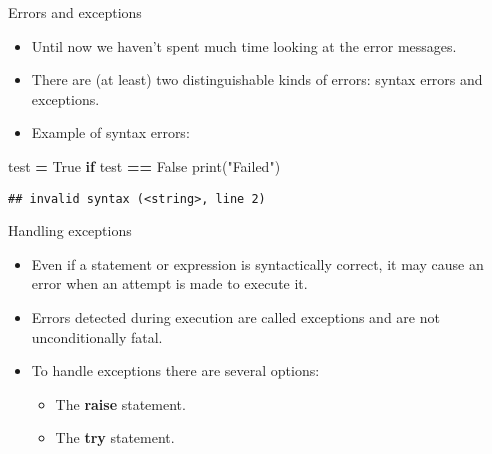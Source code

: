 \documentclass[
  8pt,
  ignorenonframetext,
]{beamer}
\newenvironment{Shaded}{\begin{snugshade}}{\end{snugshade}}
\newcommand{\BuiltInTok}[1]{#1}
\newcommand{\ControlFlowTok}[1]{\textcolor[rgb]{0.13,0.29,0.53}{\textbf{#1}}}
\newcommand{\NormalTok}[1]{#1}
\newcommand{\OperatorTok}[1]{\textcolor[rgb]{0.81,0.36,0.00}{\textbf{#1}}}
\newcommand{\StringTok}[1]{\textcolor[rgb]{0.31,0.60,0.02}{#1}}
\newcommand{\VariableTok}[1]{\textcolor[rgb]{0.00,0.00,0.00}{#1}}
\providecommand{\tightlist}{%
  \setlength{\itemsep}{0pt}\setlength{\parskip}{0pt}}
\begin{document}
\begin{frame}[fragile]{Errors and exceptions}
\protect\hypertarget{errors-and-exceptions}{}
\begin{itemize}
\item
  Until now we haven't spent much time looking at the error messages.
\item
  There are (at least) two distinguishable kinds of errors: syntax
  errors and exceptions.
\item
  Example of syntax errors:
\end{itemize}

\begin{Shaded}
\begin{Highlighting}[]
\NormalTok{test }\OperatorTok{=} \VariableTok{True}
\ControlFlowTok{if}\NormalTok{ test }\OperatorTok{==} \VariableTok{False}
  \BuiltInTok{print}\NormalTok{(}\StringTok{"Failed"}\NormalTok{)}
\end{Highlighting}
\end{Shaded}

\begin{verbatim}
## invalid syntax (<string>, line 2)
\end{verbatim}
\end{frame}

\begin{frame}{Handling exceptions}
\protect\hypertarget{handling-exceptions}{}
\begin{itemize}
\item
  Even if a statement or expression is syntactically correct, it may
  cause an error when an attempt is made to execute it.
\item
  Errors detected during execution are called exceptions and are not
  unconditionally fatal.
\item
  To handle exceptions there are several options:

  \begin{itemize}
  \tightlist
  \item
    The \textbf{raise} statement.
  \item
    The \textbf{try} statement.
  \end{itemize}
\end{itemize}
\end{frame}
\end{document}
